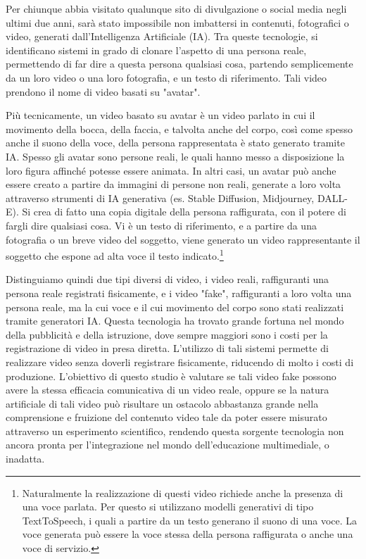 
Per chiunque abbia visitato qualunque sito di divulgazione o social media negli ultimi due anni, sarà stato impossibile non imbattersi in contenuti, fotografici o video, generati dall'Intelligenza Artificiale (IA). Tra queste tecnologie, si identificano sistemi in grado di clonare l'aspetto di una persona reale, permettendo di far dire a questa persona qualsiasi cosa, partendo semplicemente da un loro video o una loro fotografia, e un testo di riferimento. Tali video prendono il nome di video basati su "avatar".

Più tecnicamente, un video basato su avatar è un video parlato in cui il movimento della bocca, della faccia, e talvolta anche del corpo, così come spesso anche il suono della voce, della persona rappresentata è stato generato tramite IA. Spesso gli avatar sono persone reali, le quali hanno messo a disposizione la loro figura affinché potesse essere animata. In altri casi, un avatar può anche essere creato a partire da immagini di persone non reali, generate a loro volta attraverso strumenti di IA generativa (es. Stable Diffusion, Midjourney, DALL-E). Si crea di fatto una copia digitale della persona raffigurata, con il potere di fargli dire qualsiasi cosa. Vi è un testo di riferimento, e a partire da una fotografia o un breve video del soggetto, viene generato un video rappresentante il soggetto che espone ad alta voce il testo indicato.\footnote{Naturalmente la realizzazione di questi video richiede anche la presenza di una voce parlata. Per questo si utilizzano modelli generativi di tipo TextToSpeech, i quali a partire da un testo generano il suono di una voce. La voce generata può essere la voce stessa della persona raffigurata o anche una voce di servizio.}

Distinguiamo quindi due tipi diversi di video, i video reali, raffiguranti una persona reale registrati fisicamente, e i video "fake", raffiguranti a loro volta una persona reale, ma la cui voce e il cui movimento del corpo sono stati realizzati tramite generatori IA. Questa tecnologia ha trovato grande fortuna nel mondo della pubblicità e della istruzione, dove sempre maggiori sono i costi per la registrazione di video in presa diretta. L'utilizzo di tali sistemi permette di realizzare video senza doverli registrare fisicamente, riducendo di molto i costi di produzione. L'obiettivo di questo studio è valutare se tali video fake possono avere la stessa efficacia comunicativa di un video reale, oppure se la natura artificiale di tali video può risultare un ostacolo abbastanza grande nella comprensione e fruizione del contenuto video tale da poter essere misurato attraverso un esperimento scientifico, rendendo questa sorgente tecnologia non ancora pronta per l'integrazione nel mondo dell'educazione multimediale, o inadatta. 

